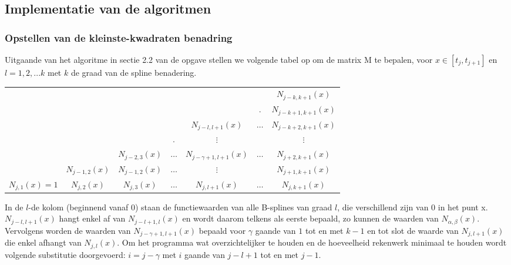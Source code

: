 \documentclass[a4paper]{article}
\begin{document}
\subsection{Implementatie van de algoritmen}
\subsubsection{Opstellen van de kleinste-kwadraten benadring}
Uitgaande van het algoritme in sectie 2.2 van de opgave stellen we volgende tabel op om de matrix M te bepalen, voor $x \in [t_j, t_{j+1}]$ en $l=1, 2, ... k$ met $k$ de graad van de spline benadering.
\begin{table}[H]
	\centering
	\begin{tabular}{| c c c c c c c  |}
		\hline
		& & & & & & $N_{j-k,k+1}(x)$ \\
		& & & & & . & $N_{j-k+1,k+1}(x)$ \\
		& & & & $N_{j-l,l+1}(x)$ & $\hdots$ & $N_{j-k+2,k+1}(x)$ \\
		& & & . & $\vdots$  & & $\vdots$\\
		& & $N_{j-2,3}(x)$ & $\hdots$ & $N_{j-\gamma+1,l+1}(x)$ & $\hdots$ & $N_{j+2,k+1}(x)$   \\
		& $N_{j-1,2}(x)$ & $N_{j-1,2}(x)$ & $\hdots$ & $\vdots$ &  &$N_{j+1,k+1}(x)$ \\
		$N_{j,1}(x) = 1$ & $N_{j,2}(x)$ & $N_{j,3}(x)$ & $\hdots$ & $N_{j,l+1}(x)$ & $\hdots$ & $N_{j,k+1}(x)$ \\ 
		\hline
	\end{tabular}
\end{table}
In de $l$-de kolom (beginnend vanaf 0) staan de functiewaarden van alle B-splines van graad $l$, die verschillend zijn van 0 in het punt x. 
$N_{j-l,l+1}(x)$ hangt enkel af van $N_{j-l+1,l}(x)$ en wordt daarom telkens als eerste bepaald, zo kunnen de waarden van $N_{\alpha,\beta}(x)$. Vervolgens worden de waarden van $N_{j-\gamma+1,l+1}(x)$ bepaald voor $\gamma$ gaande van $1$ tot en met $k-1$ en tot slot de waarde van $N_{j,l+1}(x)$ die enkel afhangt van $N_{j,l}(x)$. Om het programma wat overzichtelijker te houden en de hoeveelheid rekenwerk minimaal te houden wordt volgende substitutie doorgevoerd: $i=j-\gamma$ met $i$ gaande van $j-l+1$ tot en met $j-1$.
\newpage

\newpage
\end{document}
